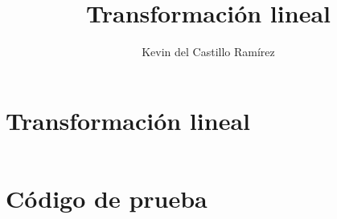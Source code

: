 \documentclass[a4paper]{article}
\title{\textbf{Transformación lineal}}
\author{Kevin del Castillo Ramírez}
\date{}
\begin{document}
\maketitle

\section{Transformación lineal}
\inputminted{cpp}{../../src/include/linear_transformation.hpp}

\section{Código de prueba}

\inputminted{cpp}{../../test/linear_transformation.cpp}
\newpage
\inputminted{cpp}{../../test/rotate_polygon.cpp}
\end{document}

